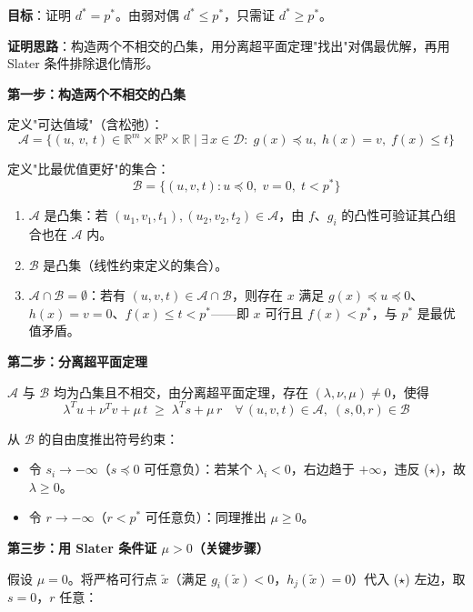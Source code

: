 \documentclass[12pt, a4paper]{ctexart}
\begin{document}
\begin{blackboard}

\textbf{目标}：证明 $d^* = p^*$。由弱对偶 $d^* \leq p^*$，只需证 $d^* \geq p^*$。

\textbf{证明思路}：构造两个不相交的凸集，用分离超平面定理"找出"对偶最优解，再用 Slater 条件排除退化情形。

\vspace{0.5em}
\textbf{第一步：构造两个不相交的凸集}

定义"可达值域"（含松弛）：
\[
\mathcal{A} = \bigl\{(u,\, v,\, t) \in \mathbb{R}^m \times \mathbb{R}^p \times \mathbb{R}
  \;\big|\; \exists\, x \in \mathcal{D}:\; g(x) \preceq u,\; h(x) = v,\; f(x) \leq t \bigr\}
\]

定义"比最优值更好"的集合：
\[
\mathcal{B} = \{(u, v, t) : u \preceq 0,\; v = 0,\; t < p^*\}
\]

\begin{enumerate}
    \item $\mathcal{A}$ 是凸集：若 $(u_1, v_1, t_1), (u_2, v_2, t_2) \in \mathcal{A}$，由 $f$、$g_i$ 的凸性可验证其凸组合也在 $\mathcal{A}$ 内。
    \item $\mathcal{B}$ 是凸集（线性约束定义的集合）。
    \item $\mathcal{A} \cap \mathcal{B} = \emptyset$：若有 $(u,v,t) \in \mathcal{A} \cap \mathcal{B}$，则存在 $x$ 满足 $g(x) \preceq u \preceq 0$、$h(x) = v = 0$、$f(x) \leq t < p^*$——即 $x$ 可行且 $f(x) < p^*$，与 $p^*$ 是最优值矛盾。
\end{enumerate}

\textbf{第二步：分离超平面定理}

$\mathcal{A}$ 与 $\mathcal{B}$ 均为凸集且不相交，由分离超平面定理，存在 $(\lambda, \nu, \mu) \neq 0$，使得
\[
\lambda^T u + \nu^T v + \mu\, t \;\geq\; \lambda^T s + \mu\, r
\quad \forall\, (u,v,t)\in\mathcal{A},\; (s, 0, r) \in \mathcal{B} \tag{$\star$}
\]

从 $\mathcal{B}$ 的自由度推出符号约束：
\begin{itemize}
    \item 令 $s_i \to -\infty$（$s \preceq 0$ 可任意负）：若某个 $\lambda_i < 0$，右边趋于 $+\infty$，违反 ($\star$)，故 $\lambda \geq 0$。
    \item 令 $r \to -\infty$（$r < p^*$ 可任意负）：同理推出 $\mu \geq 0$。
\end{itemize}

\textbf{第三步：用 Slater 条件证 $\mu > 0$（关键步骤）}

假设 $\mu = 0$。将严格可行点 $\tilde{x}$（满足 $g_i(\tilde{x}) < 0$，$h_j(\tilde{x}) = 0$）代入 ($\star$) 左边，取 $s = 0$，$r$ 任意：


\end{blackboard}
\end{document}
